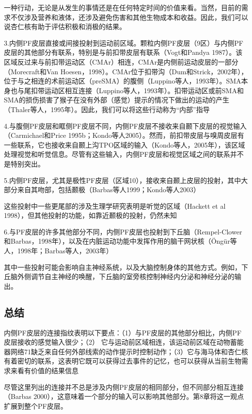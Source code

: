 一种行动，无论是从发生的事情还是在任何特定时间的价值来看。当然，目前的需求不仅涉及营养和液体，还涉及避免伤害和其他生物成本和收益。因此，我们可以说杏仁核有助于评估积极和消极的结果。\par
3.内侧PF皮层直接或间接投射到运动前区域。颗粒内侧PF皮层（9区）与内侧PF皮层的其他部分有联系，特别是与前扣带皮层有联系（Vogt和Pandya 1987）。该区域反过来与前扣带运动区（CMAr）相连，CMAr是内侧前运动皮层的一部分（Morecraft和Van Hoesen，1998）。CMAr位于扣带沟（Dum和Strick，2002年），位于与之相连的术前运动区（preSMA）的腹侧（Luppino等人，1993年）。SMA本身也与尾扣带运动区相互连接（Luppino等人，1993年）。扣带运动区或前SMA和SMA的损伤损害了猴子在没有外部（感觉）提示的情况下做出的运动的产生（Thaler等人，1995年）。因此，我们可以将这些行动称为“内部”指导\par
4.与腹侧PF皮层和眶侧PF皮层不同，内侧PF皮层不接收来自颞下皮层的视觉输入（Carmichael和Price 1995b；Kondo等人2005）。然而，前扣带皮层与嗅周皮层有一些联系，它也接收来自颞上沟TPO区域的输入（Kondo等人，2005年），该区域处理视觉和听觉信息。尽管有这些输入，内侧PF皮层和视觉区域之间的联系并不是特别突出。\par
5.内侧PF皮层，尤其是极性PF皮层（区域10），接收来自颞上皮层的投射，其中大部分来自其吻部，包括颞极（Barbas等人1999；Kondo等人2003）\par
这些投射中一些更尾部的涉及生理学研究表明是听觉的区域（Hackett et al 1998），但其他投射的功能，如靠近颞极的投射，仍然未知\par
6.与PF皮层的许多其他部分不同，内侧PF皮层也投射到下丘脑（Rempel-Clower和Barbas，1998年），以及在内脏运动功能中发挥作用的脑干网状核（Öngür等人，1998年；Barbas等人，2003年）\par
其中一些投射可能会影响自主神经系统，以及大脑控制身体的其他方式。例如，下丘脑外侧调节自主神经的唤醒，下丘脑的室旁核控制神经内分泌和神经分泌的输出。\par
\subsection{总结}
内侧PF皮层的连接指纹表明以下要点：（1）与PF皮层的其他部分相比，内侧PF皮层接收的感觉输入很少；（2） 它与运动前区域相连，该运动前区域在动物蓄能器网络71缺乏来自任何外部线索的动作提示时控制动作；（3）它与海马体和杏仁核有着密切的联系，这表明它既可以获得过去事件的记忆，也可以获得从当前生物需求来看有价值的结果信息\par
尽管这里列出的连接并不总是涉及内侧PF皮层的相同部分，但不同部分相互连接（Barbas 2000），这意味着一个部分的输入可以影响其他部分。第8章将这一观点扩展到整个PF皮层。\par
